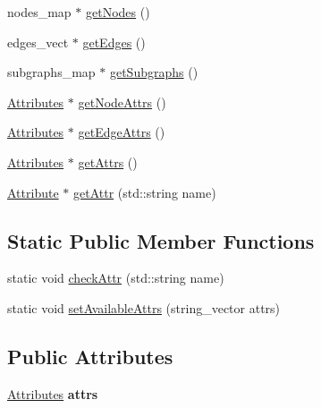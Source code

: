 \begin{DoxyCompactItemize}
\item 
nodes\+\_\+map $\ast$ \hyperlink{classmemgraph_1_1_graph_component_a616b9fc53946985fad7cc573a842e8a9}{get\+Nodes} ()
\item 
edges\+\_\+vect $\ast$ \hyperlink{classmemgraph_1_1_graph_component_a1869ee85aae4d57a8b195e98f208fa46}{get\+Edges} ()
\item 
subgraphs\+\_\+map $\ast$ \hyperlink{classmemgraph_1_1_graph_component_abc102b0429f08853dc575dc706a3d43c}{get\+Subgraphs} ()
\item 
\hyperlink{classmemgraph_1_1_attributes}{Attributes} $\ast$ \hyperlink{classmemgraph_1_1_graph_component_aed50d3e49312a4417dbfe4d8f8bf0506}{get\+Node\+Attrs} ()
\item 
\hyperlink{classmemgraph_1_1_attributes}{Attributes} $\ast$ \hyperlink{classmemgraph_1_1_graph_component_ab03a4f9057b348b9431005e4b7e5107d}{get\+Edge\+Attrs} ()
\item 
\hyperlink{classmemgraph_1_1_attributes}{Attributes} $\ast$ \hyperlink{classmemgraph_1_1_graph_component_a8401c297a13b3b52709d3212a72b0771}{get\+Attrs} ()
\item 
\hyperlink{classmemgraph_1_1_attribute}{Attribute} $\ast$ \hyperlink{classmemgraph_1_1_graph_component_afa23cf7681cf51a8f4f4d26c1b0c1eac}{get\+Attr} (std\+::string name)
\end{DoxyCompactItemize}
\subsection*{Static Public Member Functions}
\begin{DoxyCompactItemize}
\item 
static void \hyperlink{classmemgraph_1_1_graph_component_a1cf1c2b2d64838e304eafc5c7f712234}{check\+Attr} (std\+::string name)
\item 
static void \hyperlink{classmemgraph_1_1_graph_component_adb4e3b77f2e19ce830ab9982dfd37a51}{set\+Available\+Attrs} (string\+\_\+vector attrs)
\end{DoxyCompactItemize}
\subsection*{Public Attributes}
\begin{DoxyCompactItemize}
\item 
\hyperlink{classmemgraph_1_1_attributes}{Attributes} {\bfseries attrs}\hypertarget{classmemgraph_1_1_graph_component_ac286774947961c929f08bca1ee9a7730}{}\label{classmemgraph_1_1_graph_component_ac286774947961c929f08bca1ee9a7730}

\end{DoxyCompactItemize}
